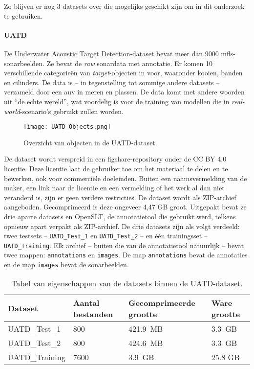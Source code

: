 Zo blijven er nog 3 datasets over die mogelijks geschikt zijn om in dit onderzoek te gebruiken. 

\newpage

\paragraph{UATD}

De Underwater Acoustic Target Detection-dataset bevat meer dan 9000 \gls{mfls}-sonarbeelden. Ze bevat de \emph{raw} sonardata met annotatie. Er komen 10 verschillende categorieën van \emph{target}-objecten in voor, waaronder kooien, banden en cilinders. De data is -- in tegenstelling tot sommige andere datasets -- verzameld door een \gls{auv} in meren en plassen. De data komt met andere woorden uit ``de echte wereld'', wat voordelig is voor de training van modellen die in \emph{real-world}-scenario's gebruikt zullen worden. \autocite{Xie_2022}

\begin{figure}[H]
    \centering
    \texttt{[image: UATD\_Objects.png]}
    \caption[UATD Objecten.]{\label{fig:uatd_objects}Overzicht van objecten in de UATD-dataset. \autocite{Xie_2022}}
\end{figure}

De dataset wordt verspreid in een figshare-repository onder de CC BY 4.0 licentie. Deze licentie laat de gebruiker toe om het materiaal te delen en te bewerken, ook voor commerciële doeleinden. Buiten een naamsvermelding van de maker, een link naar de licentie en een vermelding of het werk al dan niet veranderd is, zijn er geen verdere restricties. De dataset wordt als ZIP-archief aangeboden. Gecomprimeerd is deze ongeveer 4,47 GB groot. Uitgepakt bevat ze drie aparte datasets en OpenSLT, de annotatietool die gebruikt werd, telkens opnieuw apart verpakt als ZIP-archief. De drie datasets zijn als volgt verdeeld: twee testsets -- \texttt{UATD\_Test\_1} en \texttt{UATD\_Test\_2} -- en één trainingsset -- \texttt{UATD\_Training}. Elk archief -- buiten die van de annotatietool natuurlijk -- bevat twee mappen: \texttt{annotations} en \texttt{images}. De map \texttt{annotations} bevat de annotaties en de map \texttt{images} bevat de sonarbeelden. \autocite{Jian_2022} \\

\begin{table}[H]
    \centering
    \begin{tabular}{llll}
        \toprule
        \textbf{Dataset} & \textbf{Aantal bestanden} & \textbf{Gecomprimeerde grootte} & \textbf{Ware grootte} \\
        \midrule
        UATD\_Test\_1  & 800  & 421.9 MB & 3.3 GB \\
        UATD\_Test\_2  & 800  & 424.6 MB & 3.3 GB \\
        UATD\_Training & 7600 & 3.9 GB   & 25.8 GB \\
        \bottomrule
    \end{tabular}
    \caption[Datasets binnen UATD]{\label{tab:uatd_datasets_overview} Tabel van eigenschappen van de datasets binnen de UATD-dataset. \autocite{Jian_2022}}
\end{table}

